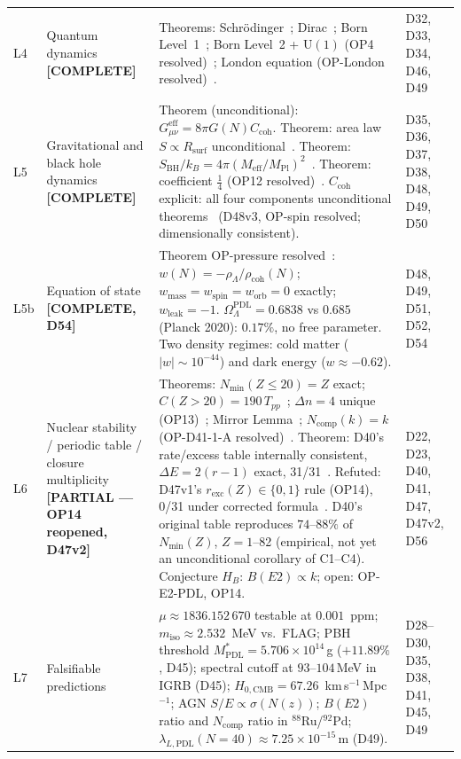 \documentclass[11pt,a4paper]{article}
\theoremstyle{plain}
\theoremstyle{definition}
\theoremstyle{remark}
\newcommand{\Rsurf}{R_{\mathrm{surf}}}
\newcommand{\SBH}{S_{\mathrm{BH}}}
\newcommand{\Meff}{M_{\mathrm{eff}}}
\newcommand{\MPl}{M_{\mathrm{Pl}}}
\newcommand{\Tpp}{T_{pp}}
\newcommand{\rhocoh}{\rho_{\mathrm{coh}}}
\newcommand{\Ccoh}{C_{\mathrm{coh}}}
\begin{document}
\begin{longtable}{L{0.6cm}L{3.0cm}L{5.5cm}L{4.0cm}}
L4 & Quantum dynamics \textbf{[COMPLETE]} & \textcolor{proofblue}{Theorems}: Schr\"odinger~\cite{D32}; Dirac~\cite{D33}; Born Level~1~\cite{D34}; Born Level~2 + $\mathrm{U}(1)$ (OP4 resolved)~\cite{D46}; London equation (OP-London resolved)~\cite{D49}. & D32, D33, D34, D46, D49\\[0.4em]
L5 & Gravitational and black hole dynamics \textbf{[COMPLETE]} & \textcolor{proofblue}{Theorem} (unconditional): $G_{\mu\nu}^{\mathrm{eff}}=8\pi G(N)\Ccoh$. \textcolor{proofblue}{Theorem}: area law $S\propto\Rsurf$ unconditional~\cite{D37}. \textcolor{proofblue}{Theorem}: $\SBH/k_B=4\pi(\Meff/\MPl)^2$~\cite{D38}. \textcolor{proofblue}{Theorem}: coefficient $\tfrac{1}{4}$ (OP12 resolved)~\cite{D50}. $\Ccoh$ explicit: all four components unconditional theorems~\cite{D48,D51,D52} (D48v3, OP-spin resolved; dimensionally consistent). & D35, D36, D37, D38, D48, D49, D50\\[0.4em]
L5b & Equation of state \textbf{[COMPLETE, D54]} & \textcolor{proofblue}{Theorem} OP-pressure resolved~\cite{D54}: $w(N) = -\rho_\Lambda/\rhocoh(N)$; $w_{\mathrm{mass}}=w_{\mathrm{spin}}=w_{\mathrm{orb}}=0$ exactly; $w_{\mathrm{leak}}=-1$. $\Omega_\Lambda^{\mathrm{PDL}}=0.6838$ vs $0.685$ (Planck 2020): $0.17\%$, no free parameter. Two density regimes: cold matter ($|w|\sim 10^{-44}$) and dark energy ($w \approx -0.62$). & D48, D49, D51, D52, D54\\[0.4em]
L6 & Nuclear stability / periodic table / closure multiplicity \textbf{[PARTIAL --- OP14 reopened, D47v2]} & \textcolor{proofblue}{Theorems}: $N_{\min}(Z\leq20)=Z$ exact; $C(Z>20)=190\,\Tpp$~\cite{D40}; $\Delta n=4$ unique (OP13)~\cite{D47}; Mirror Lemma~\cite{D47}; $N_{\mathrm{comp}}(k)=k$ (OP-D41-1-A resolved)~\cite{D56}. \textcolor{proofblue}{Theorem}: D40's rate/excess table internally consistent, $\Delta E=2(r-1)$ exact, 31/31~\cite{D47v2}. \textcolor{negativered}{Refuted}: D47v1's $r_{\mathrm{exc}}(Z)\in\{0,1\}$ rule (OP14), 0/31 under corrected formula~\cite{D47v2}. D40's original table reproduces $74$--$88\%$ of $N_{\min}(Z)$, $Z=1$--82 (empirical, not yet an unconditional corollary of C1--C4). \textcolor{conjecturegreen}{Conjecture} $H_B$: $B(E2)\propto k$; open: OP-E2-PDL, OP14. & D22, D23, D40, D41, D47, D47v2, D56\\[0.4em]
L7 & Falsifiable predictions & $\mu\approx 1836.152\,670$ testable at $0.001$~ppm; $m_{\mathrm{iso}}\approx 2.532$~MeV vs.\ FLAG; PBH threshold $M^*_{\mathrm{PDL}}=5.706\times10^{14}$\,g ($+11.89\%$, D45); spectral cutoff at $93$--$104$\,MeV in IGRB (D45); $H_{0,\mathrm{CMB}}=67.26$~km\,s$^{-1}$\,Mpc$^{-1}$; AGN $S/E \propto \sigma(N(z))$; $B(E2)$ ratio and $N_{\mathrm{comp}}$ ratio in $^{88}$Ru/$^{92}$Pd; $\lambda_{L,\mathrm{PDL}}(N=40) \approx 7.25\times10^{-15}$\,m (D49). & D28--D30, D35, D38, D41, D45, D49\\[0.3em]

\end{longtable}
\end{document}
